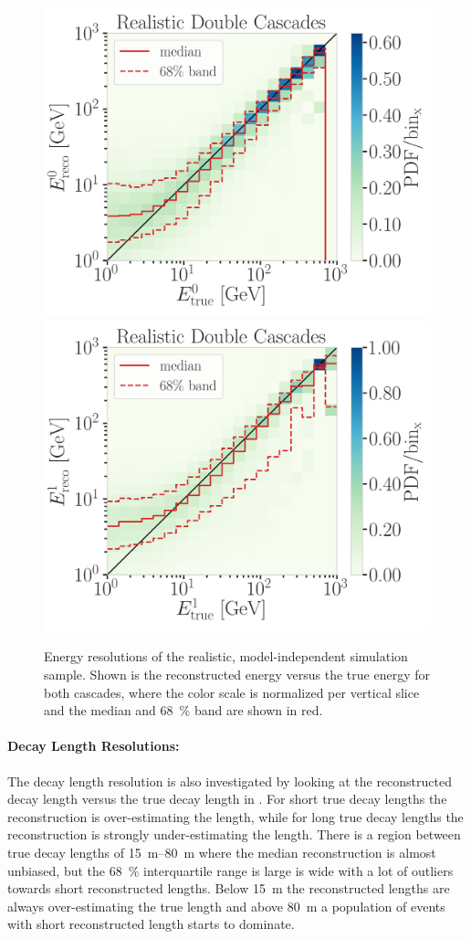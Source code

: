 \begin{figure}[h]
    \centering
    \includegraphics[width=0.49\linewidth]{figures/model_independent_simulation/results/realistic/2d_hists/194603_casc0_reco_energy_vs_casc0_true_energy_goodfit_step_contours.png}
    \includegraphics[width=0.49\linewidth]{figures/model_independent_simulation/results/realistic/2d_hists/194603_casc1_reco_energy_vs_casc1_true_energy_goodfit_step_contours.png}
    \caption[Realistic double-cascade energy resolutions]{Energy resolutions of the realistic, model-independent simulation sample. Shown is the reconstructed energy versus the true energy for both cascades, where the color scale is normalized per vertical slice and the median and \SI{68}{\percent} band are shown in red.}
\end{figure}


\paragraph{Decay Length Resolutions:}

The decay length resolution is also investigated by looking at the reconstructed decay length versus the true decay length in . For short true decay lengths the reconstruction is over-estimating the length, while for long true decay lengths the reconstruction is strongly under-estimating the length. There is a region between true decay lengths of \SIrange[range-phrase=~and~]{15}{80}{\meter} where the median reconstruction is almost unbiased, but the \SI{68}{\percent} interquartile range is large is wide with a lot of outliers towards short reconstructed lengths. Below \SI{15}{\meter} the reconstructed lengths are always over-estimating the true length and above \SI{80}{\meter} a population of events with short reconstructed length starts to dominate.

